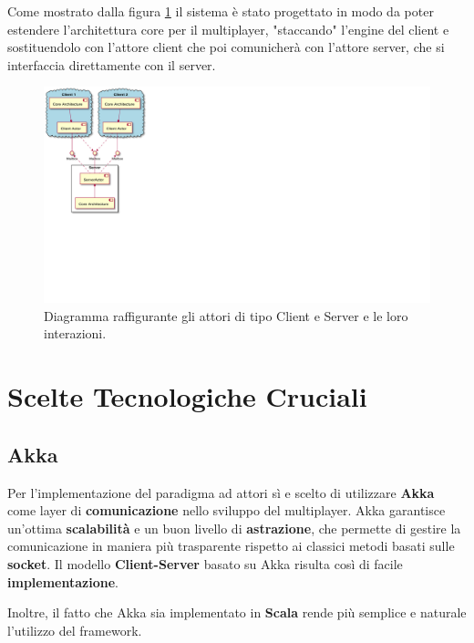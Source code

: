 Come mostrato dalla figura \ref{fig:clientServerComponentDiagram} il sistema è stato progettato in modo da poter estendere l'architettura core per il multiplayer, "staccando" l'engine del client e sostituendolo con l'attore client che poi comunicherà con l'attore server, che si interfaccia direttamente con il server.
\begin{figure}[H]
	\centering
	\includegraphics[width=0.70\columnwidth]{plantuml/rendered/componentDiagrams/clientServerComponentDiagram.pdf}
	\caption{Diagramma raffigurante gli attori di tipo Client e Server e le loro interazioni.}
	\label{fig:clientServerComponentDiagram}
\end{figure}

\section{Scelte Tecnologiche Cruciali}
    \subsection{Akka} 
        Per l'implementazione del paradigma ad attori sì e scelto di utilizzare \textbf{Akka} come layer di \textbf{comunicazione} nello sviluppo del multiplayer. Akka garantisce un'ottima \textbf{scalabilità} e un buon livello di \textbf{astrazione}, che permette di gestire la comunicazione in maniera più trasparente rispetto ai classici metodi basati sulle \textbf{socket}. Il modello \textbf{Client-Server} basato su Akka risulta così di facile \textbf{implementazione}.
        
        Inoltre, il fatto che Akka sia implementato in \textbf{Scala} rende più semplice e naturale l'utilizzo del framework. 